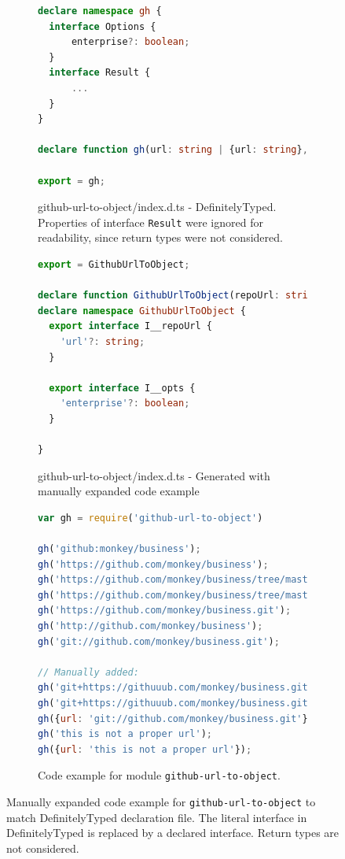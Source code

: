 \documentclass[sigplan,screen]{acmart}
\begin{document}
\begin{figure}[t]
  \centering
  \begin{subfigure}[t]{0.45\linewidth}
    \begin{lstlisting}[language=TypeScript]
declare namespace gh {
  interface Options {
      enterprise?: boolean;
  }
  interface Result {
      ...
  }
}

declare function gh(url: string | {url: string}, options?: gh.Options): gh.Result | null;

export = gh;    
    \end{lstlisting}
    \caption{github-url-to-object/index.d.ts - DefinitelyTyped. Properties of interface \texttt{Result} were ignored for readability, since return types were not considered.}
  \end{subfigure}
  \hfill
  \begin{subfigure}[t]{0.45\linewidth}
    \begin{lstlisting}[language=TypeScript]
export = GithubUrlToObject;

declare function GithubUrlToObject(repoUrl: string | GithubUrlToObject.I__repoUrl, opts?: GithubUrlToObject.I__opts): object | null;
declare namespace GithubUrlToObject {
  export interface I__repoUrl {
    'url'?: string;
  }

  export interface I__opts {
    'enterprise'?: boolean;
  }

}
    \end{lstlisting}
    \caption{github-url-to-object/index.d.ts - Generated with manually expanded code example}
  \end{subfigure}

  \begin{subfigure}{0.80\linewidth}
    \begin{lstlisting}[language=JavaScript]
var gh = require('github-url-to-object')

gh('github:monkey/business');
gh('https://github.com/monkey/business');
gh('https://github.com/monkey/business/tree/master');
gh('https://github.com/monkey/business/tree/master/nested/file.js');
gh('https://github.com/monkey/business.git');
gh('http://github.com/monkey/business');
gh('git://github.com/monkey/business.git');

// Manually added:
gh('git+https://githuuub.com/monkey/business.git', {});
gh('git+https://githuuub.com/monkey/business.git', {enterprise: true});
gh({url: 'git://github.com/monkey/business.git'});
gh('this is not a proper url');
gh({url: 'this is not a proper url'});
    \end{lstlisting}
    \caption{Code example for module \texttt{github-url-to-object}.}
    \end{subfigure}
  \caption{Manually expanded code example for
    \texttt{github-url-to-object} to match DefinitelyTyped declaration
    file. The literal interface in DefinitelyTyped is replaced by a
    declared interface. Return types are not considered.} 
  \label{fig:experiments-results-manually-completed-examples}
\end{figure}
\end{document}
